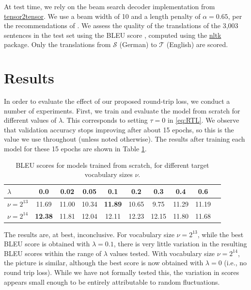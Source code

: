 \documentclass[11pt,a4paper]{article}
\begin{document}
At test time, we rely on the beam search decoder implementation from \href{https://github.com/tensorflow/tensor2tensor/blob/master/tensor2tensor/utils}{tensor2tensor}. We use a beam width of 10 and a length penalty of $\alpha=0.65$, per the recommendations of \citet{googlenmt}. We assess the quality of the translations of the 3,003 sentences in the test set using the BLEU score \citep{bleu}, computed using the \href{https://www.nltk.org/}{nltk} package. Only the translations from $\mathcal{S}$ (German) to $\mathcal{T}$ (English) are scored.




\section{Results}\label{sec:results}
In order to evaluate the effect of our proposed round-trip loss, we conduct a number of experiments. First, we train and evaluate the model from scratch for different values of $\lambda$.  This corresponds to setting $\tau=0$ in \eqref{eq:RTL}. We observe that validation accuracy stops improving after about 15 epochs, so this is the value we use throughout (unless noted otherwise). The results after training each model for these 15 epochs are shown in Table \ref{tab:result1}.

\begin{table} [ht]
\centering
\small
\begin{tabular}{ l || c | c | c | c | c | c | c | c | c  }
  $\lambda$ & 0.0 & 0.02 & 0.05 & 0.1 & 0.2 & 0.3 & 0.4 &  0.6 \\ \hline
  $\nu=2^{13}$ & 11.69 & 11.00 & 10.34 & \textbf{11.89} & 10.65 & 9.75 & 11.29 &  11.19 \\
  $\nu=2^{14}$ & \textbf{12.38} & 11.81 & 12.04 & 12.11 & 12.23 & 12.15 & 11.80 &  11.68 \\
\end{tabular}
\caption{BLEU scores for models trained from scratch, for different target vocabulary sizes $\nu$.}
\label{tab:result1}
\end{table}

The results are, at best, inconclusive. For vocabulary size $\nu=2^{13}$, while the best BLEU score is obtained with $\lambda=0.1$, there is very little variation in the resulting BLEU scores within the range of $\lambda$ values tested. With vocabulary size $\nu=2^{14}$, the picture is similar, although the best score is now obtained with $\lambda=0$ (i.e., no round trip loss). While we have not formally tested this, the variation in scores appears small enough to be entirely attributable to random fluctuations. 
\end{document}
